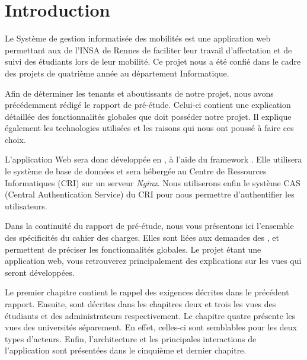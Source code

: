 \chapter*{Introduction}


Le Système de gestion informatisée des mobilités est une application web permettant aux \ris de l'INSA de Rennes de faciliter leur travail d'affectation et de suivi des étudiants lors de leur mobilité. Ce projet nous a été confié dans le cadre des projets de quatrième année au département Informatique.

\bigbreak

Afin de déterminer les tenants et aboutissants de notre projet, nous avons précédemment rédigé le rapport de pré-étude. Celui-ci contient une explication détaillée des fonctionnalités globales que doit posséder notre projet. Il explique également les technologies utilisées et les raisons qui nous ont poussé à faire ces choix. 

L'application Web sera donc développée en \php, à l'aide du framework \symfony. Elle utilisera le système de base de données \mdb et sera hébergée au Centre de Ressources Informatiques (CRI) sur un serveur \textit{Nginx}. Nous utiliserons enfin le système CAS (Central Authentication Service) du CRI pour nous permettre d'authentifier les utilisateurs.

\bigbreak

Dans la continuité du rapport de pré-étude, nous vous présentons ici l'ensemble des spécificités du cahier des charges. Elles sont liées aux demandes des \ris, et permettent de préciser les fonctionnalités globales. Le projet étant une application web, vous retrouverez principalement des explications sur les vues qui seront développées. 

Le premier chapitre contient le rappel des exigences décrites dans le précédent rapport. Ensuite, sont décrites dans les chapitres deux et trois les vues des étudiants et des administrateurs respectivement. Le chapitre quatre présente les vues des universités séparement. En effet, celles-ci sont semblables pour les deux types d'acteurs. Enfin, l'architecture et les principales interactions de l'application sont présentées dans le cinquième et dernier chapitre.
